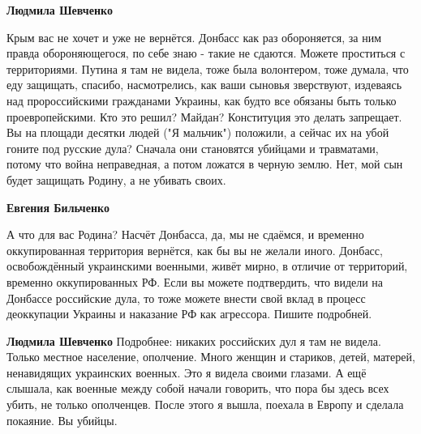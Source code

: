 \begin{itemize}
\begin{itemize}
\textbf{Людмила Шевченко} 

Крым вас не хочет и уже не вернётся. Донбасс как раз
обороняется, за ним правда обороняющегося, по себе знаю - такие не сдаются.
Можете проститься с территориями. Путина я там не видела, тоже была волонтером,
тоже думала, что еду защищать, спасибо, насмотрелись, как ваши сыновья
зверствуют, издеваясь над пророссийскими гражданами Украины, как будто все
обязаны быть только проевропейскими. Кто это решил? Майдан? Конституция это
делать запрещает. Вы на площади десятки людей ("Я мальчик") положили, а сейчас
их на убой гоните под русские дула? Сначала они становятся убийцами и
травматами, потому что война неправедная, а потом ложатся в черную землю. Нет,
мой сын будет защищать Родину, а не убивать своих.

 
\textbf{Евгения Бильченко} 

А что для вас Родина? Насчёт Донбасса, да, мы не
сдаёмся, и временно оккупированная территория вернётся, как бы вы не желали
иного. Донбасс, освобождённый украинскими военными, живёт мирно, в отличие от
территорий, временно оккупированных РФ. Если вы можете подтвердить, что видели
на Донбассе российские дула, то тоже можете внести свой вклад в процесс
деоккупации Украины и наказание РФ как агрессора. Пишите подробней.

 
\textbf{Людмила Шевченко} Подробнее: никаких российских дул я там не видела.
Только местное население, ополчение. Много женщин и стариков, детей, матерей,
ненавидящих украинских военных. Это я видела своими глазами. А ещё слышала, как
военные между собой начали говорить, что пора бы здесь всех убить, не только
ополченцев. После этого я вышла, поехала в Европу и сделала покаяние. Вы
убийцы.

 

\end{itemize}
\end{itemize}
